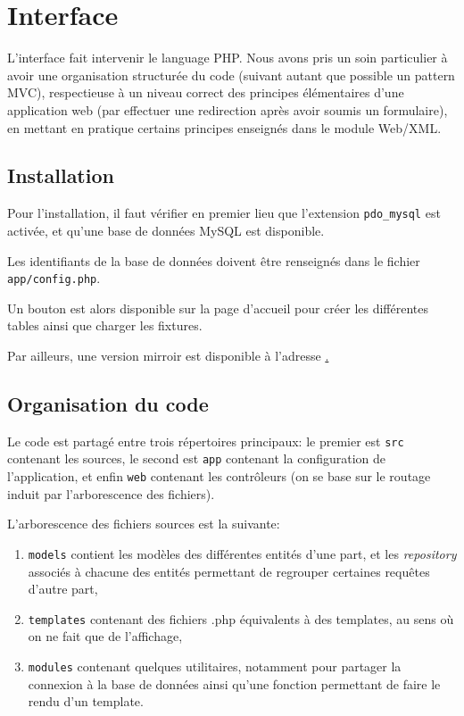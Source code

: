 \documentclass[a4paper,12pt]{article}
\begin{document}
\section{Interface}
L'interface fait intervenir le language PHP. Nous avons pris un soin particulier à avoir une organisation structurée du code (suivant autant que possible un pattern MVC), respectieuse à un niveau correct des principes élémentaires d'une application web (par effectuer une redirection après avoir soumis un formulaire), en mettant en pratique certains principes enseignés dans le module Web/XML.

\subsection{Installation}
Pour l'installation, il faut vérifier en premier lieu que l'extension \texttt{pdo\_mysql} est activée, et qu'une base de données MySQL est disponible.

Les identifiants de la base de données doivent être renseignés dans le fichier \texttt{app/config.php}.

Un bouton est alors disponible sur la page d'accueil pour créer les différentes tables ainsi que charger les fixtures.

Par ailleurs, une version mirroir est disponible à l'adresse \href{http://sgbd.silverwyrda.org}.

\subsection{Organisation du code}
Le code est partagé entre trois répertoires principaux: le premier est \texttt{src} contenant les sources, le second est \texttt{app} contenant la configuration de l'application, et enfin \texttt{web} contenant les contrôleurs (on se base sur le routage induit par l'arborescence des fichiers).

L'arborescence des fichiers sources est la suivante:
\begin{enumerate}
\item \texttt{models} contient les modèles des différentes entités d'une part, et les \emph{repository} associés à chacune des entités permettant de regrouper certaines requêtes d'autre part,
\item \texttt{templates} contenant des fichiers .php équivalents à des templates, au sens où on ne fait que de l'affichage,
\item \texttt{modules} contenant quelques utilitaires, notamment pour partager la connexion à la base de données ainsi qu'une fonction permettant de faire le rendu d'un template.
\end{enumerate}
\end{document}
